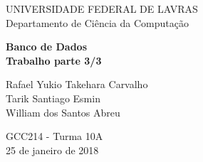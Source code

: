 \begin{titlepage}

\begin{center}
{\large UNIVERSIDADE FEDERAL DE LAVRAS}\\[5mm] 
{\large Departamento de Ciência da Computação}\\[9cm] 
\end{center}

\begin{center}
{\bf \huge Banco de Dados}\\[5mm]
{\bf \large Trabalho parte 3/3}\\[1cm]
\end{center}

\begin{flushright}
{Rafael Yukio Takehara Carvalho}\\[2mm] 
{Tarik Santiago Esmin}\\[2mm] 
{William dos Santos Abreu}\\[7cm]
\end{flushright}

\begin{center}
{GCC214 - Turma 10A}\\[2mm]
{25 de janeiro de 2018}
\end{center}

\end{titlepage}